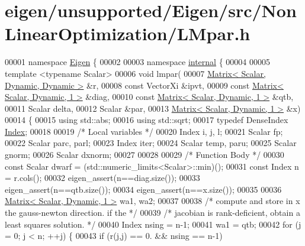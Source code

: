\hypertarget{eigen_2unsupported_2_eigen_2src_2_non_linear_optimization_2_l_mpar_8h_source}{}\section{eigen/unsupported/\+Eigen/src/\+Non\+Linear\+Optimization/\+L\+Mpar.h}
\label{eigen_2unsupported_2_eigen_2src_2_non_linear_optimization_2_l_mpar_8h_source}

\begin{DoxyCode}
00001 \textcolor{keyword}{namespace }\hyperlink{namespace_eigen}{Eigen} \{ 
00002 
00003 \textcolor{keyword}{namespace }\hyperlink{namespaceinternal}{internal} \{
00004 
00005 \textcolor{keyword}{template} <\textcolor{keyword}{typename} Scalar>
00006 \textcolor{keywordtype}{void} lmpar(
00007         \hyperlink{group___core___module}{Matrix< Scalar, Dynamic, Dynamic >} &r,
00008         \textcolor{keyword}{const} VectorXi &ipvt,
00009         \textcolor{keyword}{const} \hyperlink{group___core___module}{Matrix< Scalar, Dynamic, 1 >}  &diag,
00010         \textcolor{keyword}{const} \hyperlink{group___core___module}{Matrix< Scalar, Dynamic, 1 >}  &qtb,
00011         Scalar delta,
00012         Scalar &par,
00013         \hyperlink{group___core___module}{Matrix< Scalar, Dynamic, 1 >}  &x)
00014 \{
00015     \textcolor{keyword}{using} std::abs;
00016     \textcolor{keyword}{using} std::sqrt;
00017     \textcolor{keyword}{typedef} DenseIndex \hyperlink{namespace_eigen_a62e77e0933482dafde8fe197d9a2cfde}{Index};
00018 
00019     \textcolor{comment}{/* Local variables */}
00020     Index i, j, l;
00021     Scalar fp;
00022     Scalar parc, parl;
00023     Index iter;
00024     Scalar temp, paru;
00025     Scalar gnorm;
00026     Scalar dxnorm;
00027 
00028 
00029     \textcolor{comment}{/* Function Body */}
00030     \textcolor{keyword}{const} Scalar dwarf = (std::numeric\_limits<Scalar>::min)();
00031     \textcolor{keyword}{const} Index n = r.cols();
00032     eigen\_assert(n==diag.size());
00033     eigen\_assert(n==qtb.size());
00034     eigen\_assert(n==x.size());
00035 
00036     \hyperlink{group___core___module}{Matrix< Scalar, Dynamic, 1 >}  wa1, wa2;
00037 
00038     \textcolor{comment}{/* compute and store in x the gauss-newton direction. if the */}
00039     \textcolor{comment}{/* jacobian is rank-deficient, obtain a least squares solution. */}
00040     Index nsing = n-1;
00041     wa1 = qtb;
00042     \textcolor{keywordflow}{for} (j = 0; j < n; ++j) \{
00043         \textcolor{keywordflow}{if} (r(j,j) == 0. && nsing == n-1)

\end{DoxyCode}
